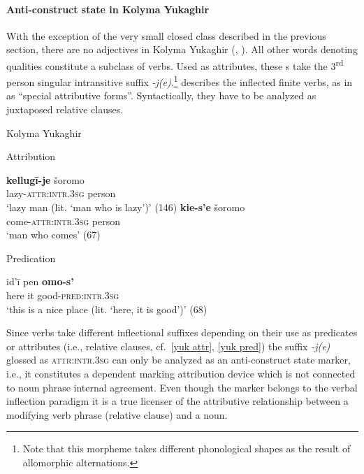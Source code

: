 \paragraph*{Anti\hyp{}construct state in Kolyma Yukaghir}
With the exception of the very small closed class described in the previous section, there are no adjectives in Kolyma Yukaghir (\citealt[79–112]{krejnovic1982}, \citealt[66–69, 145–147]{maslova2003b}). All other words denoting qualities constitute a subclass of verbs. Used as attributes, these s take the 3\textsuperscript{rd} person singular intransitive suffix \mbox{\textit{-j(e)}}.\footnote{Note that this morpheme takes different phonological shapes as the result of allomorphic alternations.} \citet[66, passim]{maslova2003b} describes the inflected finite verbs, as in  as “special attributive forms”. Syntactically, they have to be analyzed as juxtaposed relative clauses.
\begin{exe}
\ex 	
\rm{Kolyma Yukaghir \citep{maslova2003b}}
\begin{xlist}
\ex 
\label{yuk attr}
\rm{Attribution}
\begin{xlist}
\ex
\gll 	\textbf{kellugī-je} šoromo\\
	lazy-\textsc{attr:intr.3sg} person\\
\glt	‘lazy man (lit. ‘man who is lazy’)’ (146)
\ex
\gll	\textbf{kie-s'e} šoromo\\
	come-\textsc{attr:intr.3sg} person\\
\glt	‘man who comes’ (67)
\end{xlist}

\ex 
\label{yuk pred} 
\rm{Predication}
\begin{xlist}
\ex
\gll 	id'ī pen \textbf{omo-s'}\\
	here it good-\textsc{pred:intr.3sg}\\
\glt	‘this is a nice place (lit. ‘here, it is good’)’ (68)
\end{xlist}
\end{xlist}
\end{exe}
Since verbs take different inflectional suffixes depending on their use as predicates or attributes (i.e., relative clauses, cf.~\ref{yuk attr}, \ref{yuk pred}) the suffix \textit{-j(e)} glossed as \textsc{attr:intr.3sg} can only be analyzed as an anti\hyp{}construct state marker, i.e., it constitutes a dependent marking attribution device which is not connected to noun phrase internal agreement. Even though the marker belongs to the verbal inflection paradigm it is a true licenser of the attributive relationship between a modifying verb phrase (relative clause) and a noun.

